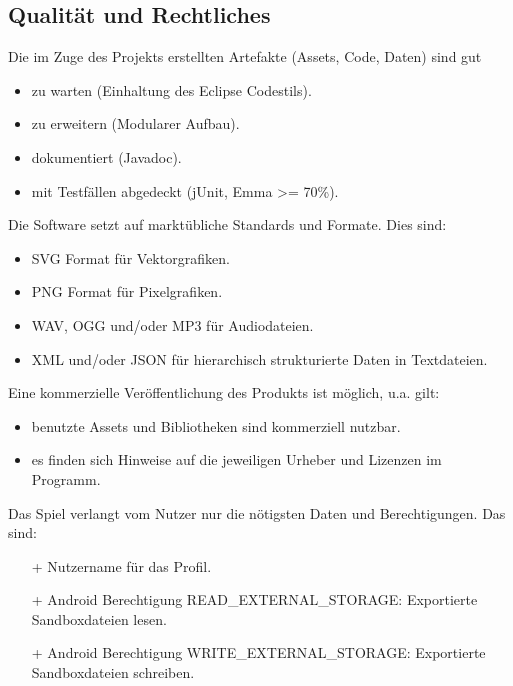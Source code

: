 \subsection{Qualität und Rechtliches}
\begin{requirements}
	 Die im Zuge des Projekts erstellten Artefakte (Assets, Code, Daten) sind gut
		\begin{itemize}
			\item zu warten (Einhaltung des Eclipse Codestils).
			\item zu erweitern (Modularer Aufbau).
			\item dokumentiert (Javadoc).
			\item mit Testfällen abgedeckt (jUnit, Emma >= 70\%).
		\end{itemize}
	 Die Software setzt auf marktübliche Standards und Formate. Dies sind:
		\begin{itemize}
			\item SVG Format für Vektorgrafiken.
			\item PNG Format für Pixelgrafiken.
			\item WAV, OGG und/oder MP3 für Audiodateien.
			\item XML und/oder JSON für hierarchisch strukturierte Daten in Textdateien.
		\end{itemize}
	 Eine kommerzielle Veröffentlichung des Produkts ist möglich, u.a. gilt:
		\begin{itemize}
			\item benutzte Assets und Bibliotheken sind kommerziell nutzbar.
			\item es finden sich Hinweise auf die jeweiligen Urheber und Lizenzen im Programm.
		\end{itemize}
	 Das Spiel verlangt vom Nutzer nur die nötigsten Daten und Berechtigungen. Das sind:
		\begin{itemize}
			\item [+] Nutzername für das Profil.
			\item [+] Android Berechtigung READ\_EXTERNAL\_STORAGE: Exportierte Sandboxdateien lesen.
			\item [+] Android Berechtigung WRITE\_EXTERNAL\_STORAGE: Exportierte Sandboxdateien schreiben.
		\end{itemize}
\end{requirements}
